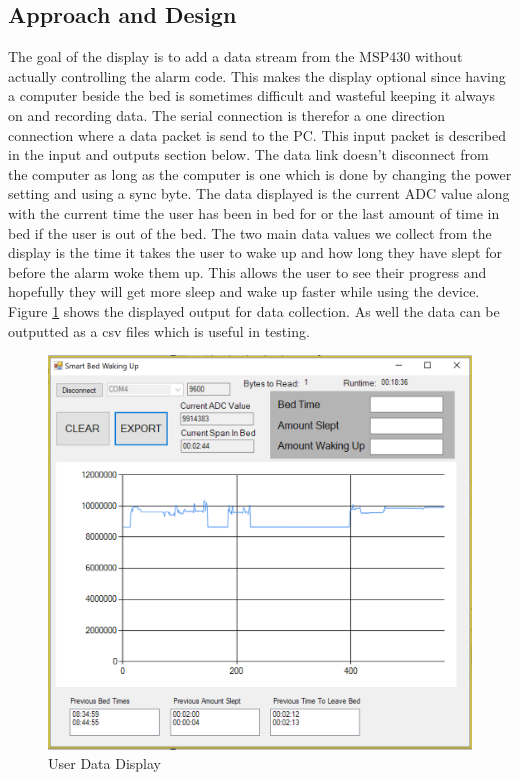 \documentclass[11pt]{article}
\begin{document}
\subsection*{Approach and Design}
The goal of the display is to add a data stream from the MSP430 without actually controlling the alarm code. 
This makes the display optional since having a computer beside the bed is sometimes difficult and wasteful keeping it always on and recording data.
The serial connection is therefor a one direction connection where a data packet is send to the PC.
This input packet is described in the input and outputs section below.
The data link doesn't disconnect from the computer as long as the computer is one which is done by changing the power setting and using a sync byte.
The data displayed is the current ADC value along with the current time the user has been in bed for or the last amount of time in bed if the user is out of the bed.
The two main data values we collect from the display is the time it takes the user to wake up and how long they have slept for before the alarm woke them up. 
This allows the user to see their progress and hopefully they will get more sleep and wake up faster while using the device. 
Figure \ref{fig:UI} shows the displayed output for data collection.
As well the data can be outputted as a csv files which is useful in testing. 
 \begin{figure}
 	\centering
 	\includegraphics[width = 0.8\linewidth]{UI}
 	\caption{User Data Display }
 	\label{fig:UI}
 \end{figure} 
\end{document}
